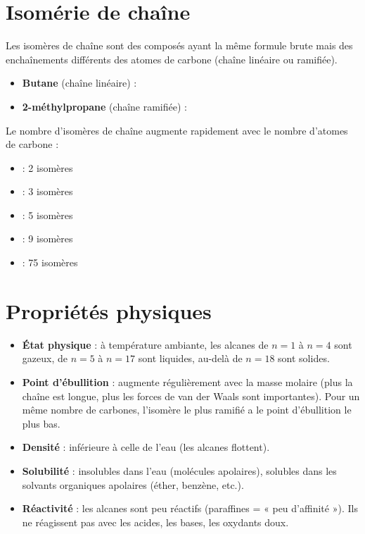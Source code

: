 \section{Isomérie de chaîne}

\begin{definition}
Les isomères de chaîne sont des composés ayant la même formule brute mais des enchaînements différents des atomes de carbone (chaîne linéaire ou ramifiée).
\end{definition}

\begin{exemple}
\begin{itemize}
    \item \textbf{Butane} (chaîne linéaire) : 
    \item \textbf{2-méthylpropane} (chaîne ramifiée) : 
\end{itemize}
\end{exemple}

\begin{propriete}
Le nombre d'isomères de chaîne augmente rapidement avec le nombre d'atomes de carbone :
\begin{itemize}
    \item {} : 2 isomères
    \item {} : 3 isomères
    \item {} : 5 isomères
    \item {} : 9 isomères
    \item {} : 75 isomères
\end{itemize}
\end{propriete}

\section{Propriétés physiques}

\begin{propriete}
\begin{itemize}
    \item \textbf{État physique} : à température ambiante, les alcanes de \(n=1\) à \(n=4\) sont gazeux, de \(n=5\) à \(n=17\) sont liquides, au-delà de \(n=18\) sont solides.
    \item \textbf{Point d'ébullition} : augmente régulièrement avec la masse molaire (plus la chaîne est longue, plus les forces de van der Waals sont importantes). Pour un même nombre de carbones, l'isomère le plus ramifié a le point d'ébullition le plus bas.
    \item \textbf{Densité} : inférieure à celle de l'eau (les alcanes flottent).
    \item \textbf{Solubilité} : insolubles dans l'eau (molécules apolaires), solubles dans les solvants organiques apolaires (éther, benzène, etc.).
    \item \textbf{Réactivité} : les alcanes sont peu réactifs (paraffines = « peu d'affinité »). Ils ne réagissent pas avec les acides, les bases, les oxydants doux.
\end{itemize}
\end{propriete}

